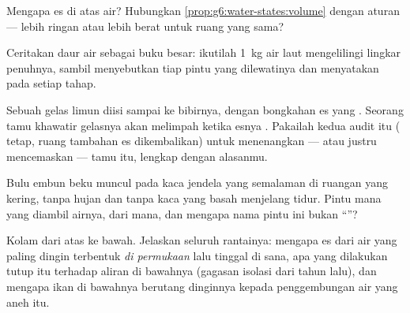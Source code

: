 \begin{exercise}[$\star$]\label{exo:g6:water-states:8}
Mengapa es  di atas air? Hubungkan
\cref{prop:g6:water-states:volume} dengan aturan  --- lebih
ringan atau lebih berat untuk ruang yang sama?
\end{exercise}

\begin{exercise}[$\star\star$]\label{exo:g6:water-states:9}
Ceritakan daur air sebagai buku besar: ikutilah \qty{1}{kg} air laut
mengelilingi lingkar penuhnya, sambil menyebutkan tiap pintu yang
dilewatinya dan menyatakan  pada setiap tahap.
\end{exercise}

\begin{exercise}[$\star\star$]\label{exo:g6:water-states:10}
Sebuah gelas limun diisi sampai ke bibirnya, dengan bongkahan es yang
. Seorang tamu khawatir gelasnya akan melimpah ketika esnya
. Pakailah kedua audit itu ( tetap, ruang tambahan es
dikembalikan) untuk menenangkan --- atau justru mencemaskan --- tamu
itu, lengkap dengan alasanmu.
\end{exercise}

\begin{exercise}[$\star\star$]\label{exo:g6:water-states:11}
Bulu embun beku muncul pada kaca jendela yang  semalaman di
ruangan yang kering, tanpa hujan dan tanpa kaca yang basah menjelang
tidur. Pintu mana yang diambil airnya, dari mana, dan mengapa nama
pintu ini bukan ``''?
\end{exercise}

\begin{exercise}[$\star\star\star$]\label{exo:g6:water-states:12}
Kolam  dari atas ke bawah. Jelaskan seluruh rantainya: mengapa
es dari air yang paling dingin terbentuk \emph{di permukaan} lalu
tinggal di sana, apa yang dilakukan tutup  itu terhadap aliran
 di bawahnya (gagasan isolasi dari tahun lalu), dan mengapa ikan
di bawahnya berutang  dinginnya kepada penggembungan air yang
aneh itu.
\end{exercise}

